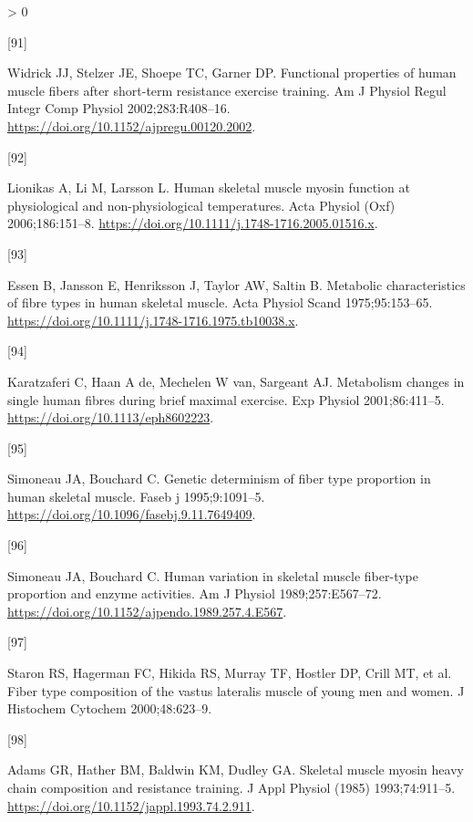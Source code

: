 \documentclass[twoside,10pt]{gihclass} %
\newlength{\cslhangindent}
\newlength{\csllabelwidth}
\newenvironment{CSLReferences}[3] %
 {%
  \setlength{\parindent}{0pt}
  \ifodd #1 \everypar{\setlength{\hangindent}{\cslhangindent}}\ignorespaces\fi
  \ifnum #2 > 0
  \setlength{\parskip}{#2\baselineskip}
  \fi
 }%
 {}
\newcommand{\CSLLeftMargin}[1]{\parbox[t]{\maxof{\widthof{#1}}{\csllabelwidth}}{#1}}
\newcommand{\CSLRightInline}[1]{\parbox[t]{\linewidth}{#1}}
\begin{document}
\begin{CSLReferences}{0}{0}
\leavevmode\hypertarget{ref-RN2169}{}%
\CSLLeftMargin{{[}91{]} }
\CSLRightInline{Widrick JJ, Stelzer JE, Shoepe TC, Garner DP. Functional properties of human muscle fibers after short-term resistance exercise training. Am J Physiol Regul Integr Comp Physiol 2002;283:R408--16. \url{https://doi.org/10.1152/ajpregu.00120.2002}.}

\leavevmode\hypertarget{ref-RN849}{}%
\CSLLeftMargin{{[}92{]} }
\CSLRightInline{Lionikas A, Li M, Larsson L. Human skeletal muscle myosin function at physiological and non-physiological temperatures. Acta Physiol (Oxf) 2006;186:151--8. \url{https://doi.org/10.1111/j.1748-1716.2005.01516.x}.}

\leavevmode\hypertarget{ref-RN1885}{}%
\CSLLeftMargin{{[}93{]} }
\CSLRightInline{Essen B, Jansson E, Henriksson J, Taylor AW, Saltin B. Metabolic characteristics of fibre types in human skeletal muscle. Acta Physiol Scand 1975;95:153--65. \url{https://doi.org/10.1111/j.1748-1716.1975.tb10038.x}.}

\leavevmode\hypertarget{ref-RN2801}{}%
\CSLLeftMargin{{[}94{]} }
\CSLRightInline{Karatzaferi C, Haan A de, Mechelen W van, Sargeant AJ. Metabolism changes in single human fibres during brief maximal exercise. Exp Physiol 2001;86:411--5. \url{https://doi.org/10.1113/eph8602223}.}

\leavevmode\hypertarget{ref-RN2798}{}%
\CSLLeftMargin{{[}95{]} }
\CSLRightInline{Simoneau JA, Bouchard C. Genetic determinism of fiber type proportion in human skeletal muscle. Faseb j 1995;9:1091--5. \url{https://doi.org/10.1096/fasebj.9.11.7649409}.}

\leavevmode\hypertarget{ref-RN2795}{}%
\CSLLeftMargin{{[}96{]} }
\CSLRightInline{Simoneau JA, Bouchard C. Human variation in skeletal muscle fiber-type proportion and enzyme activities. Am J Physiol 1989;257:E567--72. \url{https://doi.org/10.1152/ajpendo.1989.257.4.E567}.}

\leavevmode\hypertarget{ref-RN285}{}%
\CSLLeftMargin{{[}97{]} }
\CSLRightInline{Staron RS, Hagerman FC, Hikida RS, Murray TF, Hostler DP, Crill MT, et al. Fiber type composition of the vastus lateralis muscle of young men and women. J Histochem Cytochem 2000;48:623--9.}

\leavevmode\hypertarget{ref-RN2220}{}%
\CSLLeftMargin{{[}98{]} }
\CSLRightInline{Adams GR, Hather BM, Baldwin KM, Dudley GA. Skeletal muscle myosin heavy chain composition and resistance training. J Appl Physiol (1985) 1993;74:911--5. \url{https://doi.org/10.1152/jappl.1993.74.2.911}.}


\end{CSLReferences}
\end{document}
